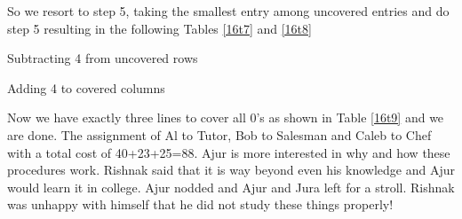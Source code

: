 So we resort to step 5, taking the smallest entry among uncovered entries and do step 5 resulting in the following Tables \ref{16t7} and \ref{16t8} 
\begin{table}
\begin{center}

\caption{Subtracting 4 from uncovered rows}\label{16t7}
\end{center}
\end{table}
\begin{table}
\begin{center}

\caption{Adding 4 to covered columns }\label{16t8}
\end{center}
\end{table}

Now we have exactly three lines to cover all 0's as shown in Table \ref{16t9} and we are done. The assignment of Al to Tutor,
Bob to Salesman and Caleb to Chef with a total cost of 40+23+25=88. Ajur is more interested in why and how these procedures work. Rishnak said that it is way beyond even his knowledge and Ajur would learn it in college. Ajur nodded and Ajur and Jura left for a stroll. Rishnak was unhappy with himself that he did not study these things properly! 


